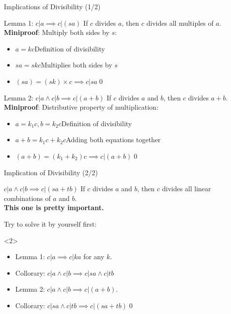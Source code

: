 
\begin{frame}{Implications of Divisibility (1/2)}

  \begin{block}{Lemma 1: $c|a \implies c|(sa)$}
    If $c$ divides $a$, then $c$ divides all multiples of $a$. {\bf Miniproof}: Multiply both sides by $s$:
    \begin{itemize}
      \item $a = kc$\hfill Definition of divisibility
      \item $sa = skc$\hfill Multiplies both sides by $s$
      \item $(sa) = (sk)\times c \implies c|sa$\qed
    \end{itemize}
  \end{block}

  \begin{block}{Lemma 2: $c|a \land c|b \implies c|(a+b)$}
    If $c$ divides $a$ and $b$, then $c$ divides $a+b$. {\bf Miniproof}: Distributive property of multiplication:
    \begin{itemize}
      \item $a = k_1c, b = k_2c$\hfill Definition of divisibility
      \item $a+b = k_1c + k_2c$\hfill Adding both equations together
      \item $(a+b) = (k_1+k_2)c \implies c|(a+b)$\qed
    \end{itemize}
  \end{block}
\end{frame}

\begin{frame}[t]{Implication of Divisibility (2/2)}

  \begin{block}{$c|a \land c|b \implies c | (sa+tb)$}
    If $c$ divides $a$ and $b$, then $c$ divides all \alert{linear combinations} of $a$ and $b$.\\
    {\bf This one is pretty important.}
  \end{block}
  Try to solve it by yourself first:\bigskip

  \begin{onlyenv}<2>
  \begin{itemize}
    \item Lemma 1: $c|a \implies c|ka$ for any $k$.\medskip
    \item Collorary: $c|a \land c|b \implies c|sa \land c|tb$\medskip
    \item Lemma 2: $c|a \land c|b \implies c|(a+b)$.\medskip
    \item Collorary: $c|sa \land c|tb \implies c|(sa+tb)$\qed
  \end{itemize}
  \end{onlyenv}
\end{frame}

